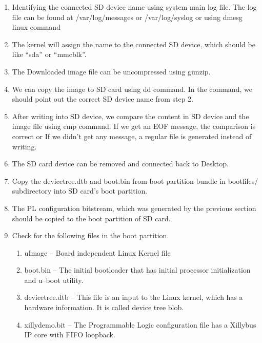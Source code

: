 \begin{enumerate}\itemsep0em 
	\item Identifying the connected SD device name using system main log file. The log file can be found at /var/log/messages or /var/log/syslog or using dmesg linux command
	
	\item The kernel will assign the name to the connected SD device, which should be like “sda” or “mmcblk”.
	\item The Downloaded image file can be uncompressed using gunzip.
	
	\item We can copy the image to SD card using dd command. In the command, we should point out the correct SD device name from step 2.
	
	\item After writing into SD device, we compare the content in SD device and the image file using cmp command. If we get an EOF message, the comparison is correct or If we didn’t get any message, a regular file is generated instead of writing.
	
	\item The SD card device can be removed and connected back to Desktop.
	\item Copy the devicetree.dtb and boot.bin from boot partition bundle in bootfiles/ subdirectory into SD card’s boot partition. 
	\item The PL configuration bitstream, which was generated by the previous section should be copied to the boot partition of SD card.
	\item Check for the following files in the boot partition.
	\begin{enumerate}\itemsep0em 
		\item uImage -- Board independent Linux Kernel file
		\item boot.bin -- The initial bootloader that has initial processor initialization and u--boot utility.
		\item devicetree.dtb -- This file is an input to the Linux kernel, which has a hardware information. It is called device tree blob.
		\item xillydemo.bit -- The Programmable Logic configuration file has a Xillybus IP core with FIFO loopback.
	\end{enumerate}
\end{enumerate}

